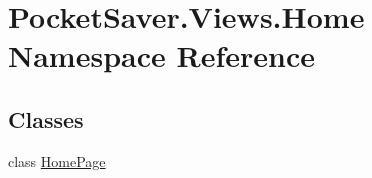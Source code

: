 \hypertarget{namespace_pocket_saver_1_1_views_1_1_home}{}\section{Pocket\+Saver.\+Views.\+Home Namespace Reference}
\label{namespace_pocket_saver_1_1_views_1_1_home}
\subsection*{Classes}
\begin{DoxyCompactItemize}
\item 
class \hyperlink{class_pocket_saver_1_1_views_1_1_home_1_1_home_page}{Home\+Page}
\end{DoxyCompactItemize}
